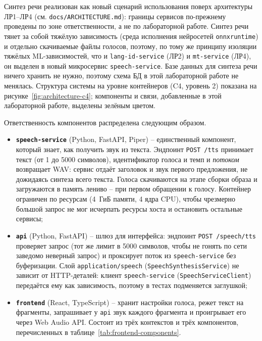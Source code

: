 

Синтез речи реализован как новый сценарий использования поверх
архитектуры ЛР1--ЛР4 (см. \texttt{docs/ARCHITECTURE.md}): границы
сервисов по-прежнему проведены по зоне ответственности, а не по
лабораторной работе. Синтез речи тянет за собой тяжёлую зависимость
(среда исполнения нейросетей \texttt{onnxruntime}) и отдельно
скачиваемые файлы голосов, поэтому, по тому же принципу изоляции
тяжёлых ML-зависимостей, что и \texttt{lang-id-service} (ЛР2) и
\texttt{mt-service} (ЛР4), он выделен в новый микросервис
\texttt{speech-service}. Базе данных для синтеза речи ничего хранить не
нужно, поэтому схема БД в этой лабораторной работе не менялась.
Структура системы на уровне контейнеров (C4, уровень 2) показана на
рисунке~\ref{fig:architecture-c4}; компоненты и связи, добавленные в
этой лабораторной работе, выделены зелёным цветом.


Ответственность компонентов распределена следующим образом.
\begin{itemize}
  \item \textbf{\texttt{speech-service}} (Python, FastAPI, Piper) --
  единственный компонент, который знает, как получить звук из текста.
  Эндпоинт \texttt{POST /tts} принимает текст (от 1 до 5000 символов),
  идентификатор голоса и темп и \emph{потоком} возвращает WAV: сервис
  отдаёт заголовок и звук первого предложения, не дожидаясь синтеза
  всего текста. Голоса скачиваются на этапе сборки образа и
  загружаются в память лениво -- при первом обращении к голосу.
  Контейнер ограничен по ресурсам (4~ГиБ памяти, 4 ядра CPU), чтобы
  чрезмерно большой запрос не мог исчерпать ресурсы хоста и остановить
  остальные сервисы;
  \item \textbf{\texttt{api}} (Python, FastAPI) -- шлюз для интерфейса:
  эндпоинт \texttt{POST /speech/tts} проверяет запрос (тот же лимит в
  5000 символов, чтобы не гонять по сети заведомо неверный запрос) и
  проксирует поток из \texttt{speech-service} без буферизации. Слой
  \texttt{application/speech} (\texttt{SpeechSynthesisService}) не
  зависит от HTTP-деталей: клиент \texttt{speech-service}
  (\texttt{SpeechServiceClient}) передаётся ему как зависимость, поэтому
  в тестах подменяется заглушкой;
  \item \textbf{\texttt{frontend}} (React, TypeScript) -- хранит настройки
  голоса, режет текст на фрагменты, запрашивает у \texttt{api} звук
  каждого фрагмента и проигрывает его через Web Audio API. Состоит из
  трёх контекстов и трёх компонентов, перечисленных в
  таблице~\ref{tab:frontend-components}.
\end{itemize}


